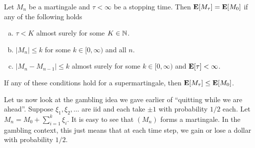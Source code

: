 \begin{lemma}
	\label{optional stopping}
	Let $M_n$ be a martingale and $\tau<\infty$ be a stopping time. Then $\textbf{E}[M_\tau]=\textbf{E}[M_0]$ if any of the following holds
	\begin{enumerate}[(a)]
		\item $\tau<K$ almost surely for some $K\in\mathbb{N}$.
		\item $|M_n|\leq k$ for some $k\in[0,\infty)$ and all $n$.
		\item $|M_n-M_{n-1}|\leq k$ almost surely for some $k\in[0,\infty)$ and $\textbf{E}[\tau]<\infty$.
	\end{enumerate}
	If any of these conditions hold for a supermartingale, then $\textbf{E}[M_\tau]\leq\textbf{E}[M_0]$.
\end{lemma}

Let us now look at the gambling idea we gave earlier of ``quitting while we are ahead''. Suppose $\xi_1,\xi_2,\ldots$ are iid and each take $\pm 1$ with probability $1/2$ each. Let $M_n = M_0 + \sum_{i=1}^k \xi_i$. It is easy to see that $(M_n)$ forms a martingale. In the gambling context, this just means that at each time step, we gain or lose a dollar with probability $1/2$.\\
